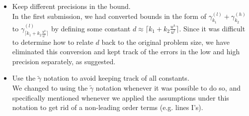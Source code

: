 \documentclass[10pt]{article}
\begin{document}
\begin{enumerate}
\begin{itemize}
{		}
	\item Keep different precisions in the bound.\\
	{\normalfont
		In the first submission, we had converted bounds in the form of $\gamma_{k_1}^{(l)}+\gamma_{k_2}^{(h)}$ to $\gamma_{\lceil k_1+k_2\frac{u^h}{u^l}\rceil}^{(l)}$ by defining some constant $d\approx \lceil k_1+k_2\frac{u^h}{u^l}\rceil$. 
		Since it was difficult to determine how to relate $d$ back to the original problem size, we have eliminated this conversion and kept track of the errors in the low and high precision separately, as suggested. 
	}
	\item Use the $\tilde{\gamma}$ notation to avoid keeping track of all constants.\\
	{\normalfont
	We changed to using the $\tilde{\gamma}$ notation whenever it was possible to do so, and specifically mentioned whenever we applied the assumptions under this notation to get rid of a non-leading order terms (e.g. lines I's).
	}
	\end{itemize}
	

\end{enumerate}
\end{document}
